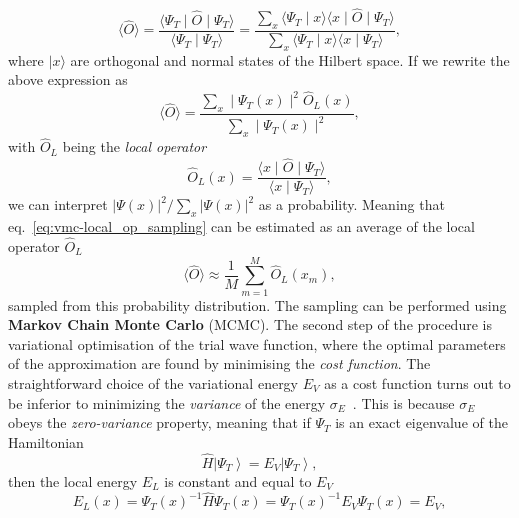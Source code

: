 \begin{equation}
	\langle\hat{O}\rangle=\frac{\langle\Psi_{T}\mid\hat{O}\mid \Psi_{T}\rangle}{\langle\Psi_{T} \mid \Psi_{T}\rangle}=\frac{\sum_{x}\langle\Psi_{T} \mid x\rangle\langle x\mid\hat{O}\mid \Psi_{T}\rangle}{\sum_{x}\langle\Psi_{T} \mid x\rangle\langle x \mid \Psi_{T}\rangle},
\end{equation}
where $\mid x \rangle$ are orthogonal and normal states of the Hilbert space. If we rewrite the above expression as 
\begin{equation}
	\label{eq:vmc-local_op_sampling}
	\langle \hat{O} \rangle = \frac{\sum_{x}\mid\Psi_{T}(x)\mid^{2} \hat{O}_{L}(x)}{\sum_{x}\mid\Psi_{T}(x)\mid^{2}},
\end{equation}
with $\hat{O}_L$ being the \emph{local operator}
\begin{equation}
	\hat{O}_{L}(x)=\frac{\langle x\mid\hat{O}\mid \Psi_{T}\rangle}{\langle x \mid \Psi_{T}\rangle}, 
\end{equation}
	we can interpret $|\Psi(x)|^{2}/\sum_{x}|\Psi(x)|^{2}$ as a probability. Meaning that eq.~\eqref{eq:vmc-local_op_sampling} can be estimated as an average of the local operator $\hat{O}_L$
\begin{equation}
	\langle\hat{O}\rangle \approx \frac{1}{M} \sum_{m=1}^{M} \hat{O}_{L}\left(x_{m}\right),
\end{equation}
sampled from this probability distribution. The sampling can be performed using \textbf{Markov Chain Monte Carlo} (MCMC). The second step of the procedure is variational optimisation of the trial wave function, where the optimal parameters of the approximation are found by minimising the \emph{cost function}. The straightforward choice of the variational energy $E_V$ as a cost function turns out to be inferior to minimizing the \emph{variance} of the energy $\sigma_E$~\cite{foulkes2001quantum}. This is because $\sigma_E$ obeys the \emph{zero-variance} property, meaning that if $\Psi_{T}$ is an exact eigenvalue of the Hamiltonian
\begin{equation}
	\hat{H}\left|\Psi_{T}\right\rangle=E_{V}\left|\Psi_{T}\right\rangle,
\end{equation}
then the local energy $E_L$ is constant and equal to $E_V$
\begin{equation}
	E_{L}(x)=\Psi_{T}(x)^{-1} \hat{H} \Psi_{T}(x)=\Psi_{T}(x)^{-1} E_{V} \Psi_{T}(x)=E_{V},
\end{equation}
